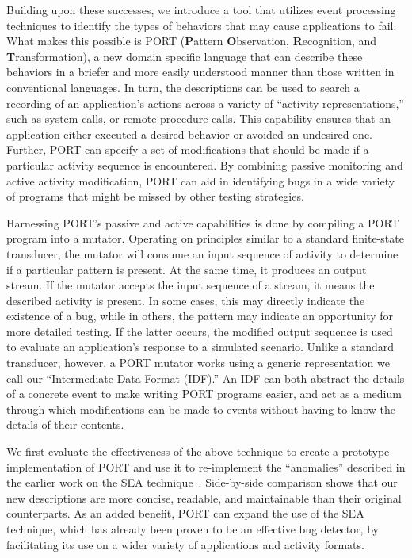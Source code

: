 Building upon these successes,
we introduce a tool
that utilizes event processing techniques
to identify
the types of behaviors 
that may cause applications to fail.
What makes this possible is PORT
(\textbf{P}attern \textbf{O}bservation, \textbf{R}ecognition, and
\textbf{T}ransformation),
a new domain specific language
that can describe these behaviors
in a briefer and more easily understood manner than those written in conventional languages. In turn, the descriptions can be used
to search a recording of an application's actions
across a variety of ``activity representations,''
such as system calls,
or remote procedure calls.
This capability ensures that an application either executed a desired behavior
or avoided an undesired one.
Further, PORT can specify
a set of modifications
that should be made
if a particular activity sequence is encountered.
By combining passive monitoring and active activity modification,
PORT can aid in identifying bugs
in a wide variety of programs
that might be missed by other testing strategies.

Harnessing PORT's passive and active capabilities is done
by compiling a PORT program
into a mutator.
Operating  on principles similar
to a standard finite-state transducer,
the mutator will consume an input sequence of activity
to determine if a particular pattern is present. At the same time, it
produces an output stream.
If the mutator accepts the input sequence of a stream,
it means the described activity is present.
In some cases,
this may directly indicate
the existence of a bug, while in
others, 
the pattern may
indicate an opportunity
for more detailed testing. If the latter occurs, 
the modified output sequence is used to evaluate an application's response to a simulated scenario.
Unlike a standard transducer, however,  
a PORT mutator works using a generic representation we call our ``Intermediate Data Format (IDF).''
An IDF can both abstract the details of a concrete event to make writing PORT programs easier, and 
act as a medium through which modifications can be made to events without having to
know the details of their contents.

We first evaluate the effectiveness of the above technique to
create a prototype implementation of PORT
and use it to
re-implement the ``anomalies''
described in the earlier work on the SEA technique~\cite{DBLP:conf/issre/MooreCFW19}.
Side-by-side comparison shows that our new
descriptions are more concise,
readable,
and maintainable
than their original counterparts.
As an added benefit,
PORT can expand the use of the SEA technique,
which has already been proven
to be an effective bug detector,
by facilitating its use
on a wider variety of applications and activity formats.

